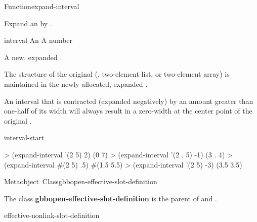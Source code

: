 \documentclass[10pt,twoside,english,pdftex]{article}
\begin{document}
\begin{functiondoc}{Function}{expand-interval}%
  { \returns{} }
%
%

\fnsyntax

\fnpurpose Expand an  by .

\fnpackage {}

\fnmodule {}

\fnargs
\begin{args}{interval}
\arg[interval] An 
\arg[amount] A number
\end{args}

\fnreturns A new, expanded .

\fndescription The structure of the original 
(, two-element list, or two-element array) is maintained in the
newly allocated, expanded .

An interval that is contracted (expanded negatively) by an amount
greater than one-half of its width will always result in a zero-width
 at the center point of the original .

\begin{alsos}{interval-start}
\end{alsos}

\fnexamples
\begin{example}
> (expand-interval '(2 5) 2)
(0 7)
> (expand-interval '(2 . 5) -1)
(3 . 4)
> (expand-interval #(2 5) .5)
#(1.5 5.5)
> (expand-interval '(2 5) -3)
(3.5 3.5)
\end{example}

\end{functiondoc}


\begin{functiondoc}{Metaobject~Class}{gbbopen-effective-slot-definition}{}
%

\fnsyntax

\fnpackage {}

\fnmodule {}

\fndescription The class \textbf{gbbopen-effective-slot-definition} is the
parent  of \textbf{} and
\textbf{}.
 
\begin{alsos}{effective-nonlink-slot-definition}
\end{alsos}

\end{functiondoc}
\end{document}
